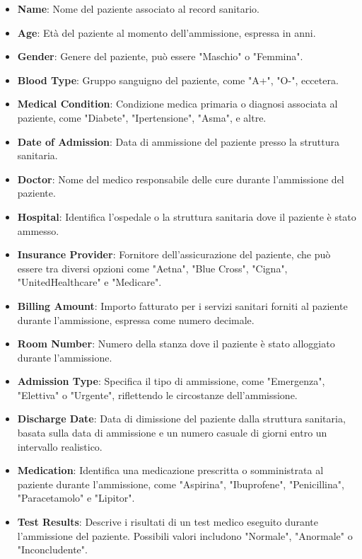 \begin{itemize}
  \item \textbf{Name}: Nome del paziente associato al record sanitario.
  \item \textbf{Age}: Età del paziente al momento dell'ammissione, espressa in anni.
  \item \textbf{Gender}: Genere del paziente, può essere "Maschio" o "Femmina".
  \item \textbf{Blood Type}: Gruppo sanguigno del paziente, come "A+", "O-", eccetera.
  \item \textbf{Medical Condition}: Condizione medica primaria o diagnosi associata al paziente, come "Diabete", "Ipertensione", "Asma", e altre.
  \item \textbf{Date of Admission}: Data di ammissione del paziente presso la struttura sanitaria.
  \item \textbf{Doctor}: Nome del medico responsabile delle cure durante l'ammissione del paziente.
  \item \textbf{Hospital}: Identifica l'ospedale o la struttura sanitaria dove il paziente è stato ammesso.
  \item \textbf{Insurance Provider}: Fornitore dell'assicurazione del paziente, che può essere tra diversi opzioni come "Aetna", "Blue Cross", "Cigna", "UnitedHealthcare" e "Medicare".
  \item \textbf{Billing Amount}: Importo fatturato per i servizi sanitari forniti al paziente durante l'ammissione, espressa come numero decimale.
  \item \textbf{Room Number}: Numero della stanza dove il paziente è stato alloggiato durante l'ammissione.
  \item \textbf{Admission Type}: Specifica il tipo di ammissione, come "Emergenza", "Elettiva" o "Urgente", riflettendo le circostanze dell'ammissione.
  \item \textbf{Discharge Date}: Data di dimissione del paziente dalla struttura sanitaria, basata sulla data di ammissione e un numero casuale di giorni entro un intervallo realistico.
  \item \textbf{Medication}: Identifica una medicazione prescritta o somministrata al paziente durante l'ammissione, come "Aspirina", "Ibuprofene", "Penicillina", "Paracetamolo" e "Lipitor".
  \item \textbf{Test Results}: Descrive i risultati di un test medico eseguito durante l'ammissione del paziente. Possibili valori includono "Normale", "Anormale" o "Inconcludente".
\end{itemize}


